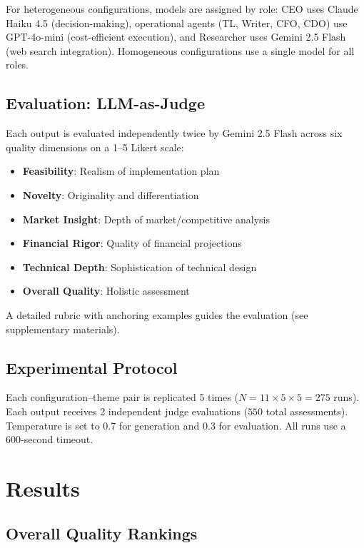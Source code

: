 \documentclass[conference]{IEEEtran}
\begin{document}
For heterogeneous configurations, models are assigned by role:
CEO uses Claude Haiku 4.5 (decision-making),
operational agents (TL, Writer, CFO, CDO) use GPT-4o-mini (cost-efficient execution),
and Researcher uses Gemini 2.5 Flash (web search integration).
Homogeneous configurations use a single model for all roles.

\subsection{Evaluation: LLM-as-Judge}

Each output is evaluated independently twice by Gemini 2.5 Flash across six quality dimensions on a 1--5 Likert scale:

\begin{itemize}
    \item \textbf{Feasibility}: Realism of implementation plan
    \item \textbf{Novelty}: Originality and differentiation
    \item \textbf{Market Insight}: Depth of market/competitive analysis
    \item \textbf{Financial Rigor}: Quality of financial projections
    \item \textbf{Technical Depth}: Sophistication of technical design
    \item \textbf{Overall Quality}: Holistic assessment
\end{itemize}

A detailed rubric with anchoring examples guides the evaluation (see supplementary materials).

\subsection{Experimental Protocol}

Each configuration--theme pair is replicated 5 times ($N = 11 \times 5 \times 5 = 275$ runs).
Each output receives 2 independent judge evaluations ($550$ total assessments).
Temperature is set to 0.7 for generation and 0.3 for evaluation.
All runs use a 600-second timeout.

\section{Results}
\label{sec:results}

\subsection{Overall Quality Rankings}
\end{document}
